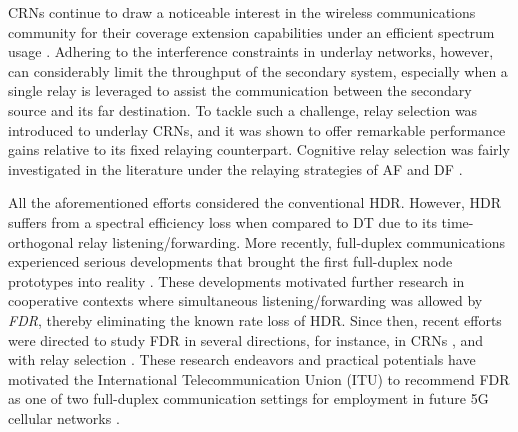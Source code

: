\documentclass[10pt,journal]{IEEEtran}
\begin{document}
\acp{CRN} continue to draw a noticeable interest in the wireless communications community for their coverage extension capabilities under an efficient spectrum usage \cite{200905_ProcIEEE_CRNs}. Adhering to the interference constraints in underlay networks, however, can considerably limit the throughput of the secondary system, especially when a single relay is leveraged to assist the communication between the secondary source and its far destination. To tackle such a challenge, relay selection
\cite{200603_JSAC_Bletsas_Relay_selection,200810_TWC_Michlopoulos_Relay_Selection}
was introduced to underlay \acp{CRN}, and it was shown to offer remarkable performance gains relative to its fixed relaying counterpart. Cognitive relay selection was fairly investigated in the literature under the relaying strategies of \ac{AF} \cite{201206_ICC_Hussain_AF1,201308_WCL_Chen_AF}
and \ac{DF} \cite{201102_TWC_Lee_DF,201110_TWC_Sagong_DF}.

All the aforementioned efforts considered the conventional \ac{HDR}. However, \ac{HDR} suffers from a spectral efficiency loss when compared to \ac{DT} due to its time-orthogonal relay listening/forwarding. More recently, full-duplex communications experienced serious developments that brought the first full-duplex node prototypes into reality \cite{mobicom2011fullduplex,201212_TWC_Duarte}.
These developments motivated further research in cooperative contexts where simultaneous listening/forwarding was allowed by \emph{\ac{FDR}}, thereby eliminating the known rate loss of \ac{HDR}. Since then, recent efforts were directed to study FDR in several directions, for instance, in \acp{CRN} \cite{201305_TWC_Cognitive_FDR_Krikidis,201210_TWC_Cognitive_FDR_Daesik_DF},
and with relay selection \cite{201206_ICC_Krikidis_FDR_Selection_AF,201212_TWC_Krikidis_FDR_Selection_AF,201012_EL_Rui_FDR_Selection_DF,201406_ICC14_FDRS_Zhong,Khafagy_CogFDRS_ICCW15, Khafagy_FDRS_CAMAD15, 201505_Hanzo_RS_Cognitive, 201510_TVT_FDRS_Zhong, 201602_IET_Wang_FDRS, 201701_SigTelCom, 2017XX_SurvTut_RS_Cognitive}. These research endeavors and practical potentials have motivated the International Telecommunication Union (ITU) to recommend FDR as one of two full-duplex communication settings for employment in future \ac{5G} cellular networks \cite{201509_ITU_R_RECOMMENDATION_M2083,201411_ITU_R_REPORT_M2320}.

\end{document}

